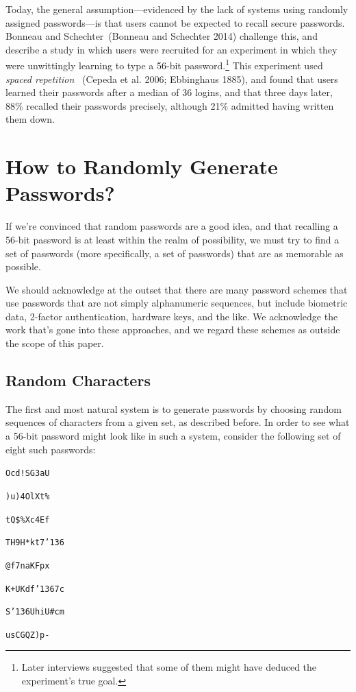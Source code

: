 \documentclass[preprint]{soups}
\newcommand{\sectionNewpage}{}
\newcommand{\Scribtexttt}[1]{{\texttt{#1}}}
\newenvironment{SingleColumn}{\begin{list}{}{\topsep=0pt\partopsep=0pt%
\listparindent=0pt\itemindent=0pt\labelwidth=0pt\leftmargin=0pt\rightmargin=0pt%
\itemsep=0pt\parsep=0pt}\item}{\end{list}}
\let\SOriginalthesubsection\thesubsection
\let\SOriginalthesubsubsection\thesubsubsection
\newcommand{\Ssection}[2]{\section[#1]{#2}\let\thesubsection\SOriginalthesubsection}
\newcommand{\Ssubsection}[2]{\subsection[#1]{#2}\let\thesubsubsection\SOriginalthesubsubsection}
\newcommand{\NoteBox}[1]{\footnote{#1}}
\newcommand{\NoteContent}[1]{#1}
\begin{document}
Today, the general assumption{---}evidenced by the lack of
systems using randomly assigned passwords{---}is that users
cannot be expected to recall secure passwords. Bonneau and
Schechter~(Bonneau and Schechter 2014) challenge this, and describe a
study in which users were recruited for an experiment in
which they were unwittingly learning to type a 56{-}bit
password.\NoteBox{\NoteContent{Later interviews suggested that some of them
might have deduced the experiment{'}s true goal.}} This
experiment used \textit{spaced repetition}
~(Cepeda et al. 2006; Ebbinghaus 1885), and found that users
learned their passwords after a median of 36 logins, and
that three days later, 88\% recalled their passwords
precisely, although 21\% admitted having written them down.

\sectionNewpage

\Ssection{How to Randomly Generate Passwords?}{How to Randomly Generate Passwords?}\label{t:x28part_x22Howx5ftox5fRandomlyx5fGeneratex5fPasswordsx5fx22x29}

If we{'}re convinced that random passwords are a good idea,
and that recalling a 56{-}bit password is at least within the
realm of possibility, we must try to find a set of passwords
(more specifically, a set of  passwords) that are
as memorable as possible.

We should acknowledge at the outset that there are many
password schemes that use passwords that are not simply
alphanumeric sequences, but include biometric data, 2{-}factor
authentication, hardware keys, and the like. We acknowledge
the work that{'}s gone into these approaches, and we regard
these schemes as outside the scope of this paper.

\Ssubsection{Random Characters}{Random Characters}\label{t:x28part_x22Randomx5fCharactersx22x29}

The first and most natural system is to generate passwords
by choosing random sequences of characters from a given set,
as described before.  In order to see what a 56{-}bit password
might look like in such a system, consider the following set
of eight such passwords:

\begin{SingleColumn}\Scribtexttt{Ocd{\hbox{\texttt{!}}}SG3aU}

\Scribtexttt{)u)4OlXt\%}

\Scribtexttt{tQ\$\%Xc4Ef}

\Scribtexttt{TH9H*kt7{\char'136}}

\Scribtexttt{@f7naKFpx}

\Scribtexttt{K+UKdf{\char'136}7c}

\Scribtexttt{S{\char'136}UhiU\#cm}

\Scribtexttt{usCGQZ)p{-}}\end{SingleColumn}
\end{document}
